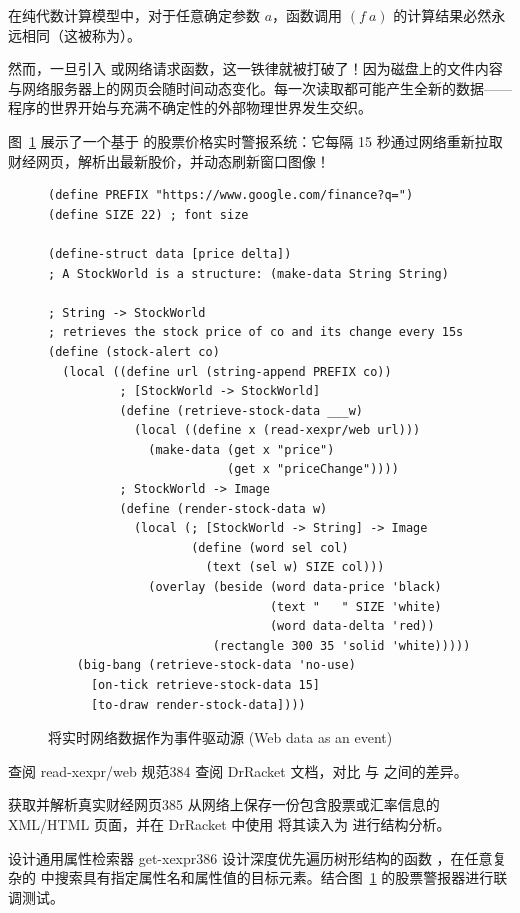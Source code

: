\begin{notebox}
在纯代数计算模型中，对于任意确定参数 $a$，函数调用 $(f\ a)$ 的计算结果必然永远相同（这被称为）。

然而，一旦引入  或网络请求函数，这一铁律就被打破了！因为磁盘上的文件内容与网络服务器上的网页会随时间动态变化。每一次读取都可能产生全新的数据——程序的世界开始与充满不确定性的外部物理世界发生交织。
\end{notebox}

图~\ref{fig:133} 展示了一个基于  的股票价格实时警报系统：它每隔 15 秒通过网络重新拉取财经网页，解析出最新股价，并动态刷新窗口图像！

\begin{figure}[htbp]
  \centering
\begin{lstlisting}[language=BSL, basicstyle=\scriptsize\ttfamily]
(define PREFIX "https://www.google.com/finance?q=")
(define SIZE 22) ; font size

(define-struct data [price delta])
; A StockWorld is a structure: (make-data String String)

; String -> StockWorld
; retrieves the stock price of co and its change every 15s
(define (stock-alert co)
  (local ((define url (string-append PREFIX co))
          ; [StockWorld -> StockWorld]
          (define (retrieve-stock-data ___w)
            (local ((define x (read-xexpr/web url)))
              (make-data (get x "price")
                         (get x "priceChange"))))
          ; StockWorld -> Image
          (define (render-stock-data w)
            (local (; [StockWorld -> String] -> Image
                    (define (word sel col)
                      (text (sel w) SIZE col)))
              (overlay (beside (word data-price 'black)
                               (text "   " SIZE 'white)
                               (word data-delta 'red))
                       (rectangle 300 35 'solid 'white)))))
    (big-bang (retrieve-stock-data 'no-use)
      [on-tick retrieve-stock-data 15]
      [to-draw render-stock-data])))
\end{lstlisting}
  \caption{将实时网络数据作为事件驱动源 (Web data as an event)}
  \label{fig:133}
\end{figure}

\begin{exercise}{查阅 read-xexpr/web 规范}{384}
查阅 DrRacket 文档，对比  与  之间的差异。
\end{exercise}

\begin{exercise}{获取并解析真实财经网页}{385}
从网络上保存一份包含股票或汇率信息的 XML/HTML 页面，并在 DrRacket 中使用  将其读入为  进行结构分析。
\end{exercise}

\begin{exercise}{设计通用属性检索器 get-xexpr}{386}
设计深度优先遍历树形结构的函数 ，在任意复杂的  中搜索具有指定属性名和属性值的目标元素。结合图~\ref{fig:133} 的股票警报器进行联调测试。
\end{exercise}
